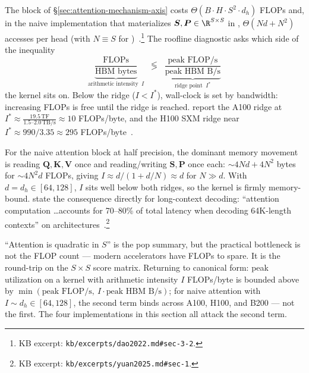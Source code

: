 The  block of \S\ref{sec:attention-mechanism-axis}
costs $\Theta(B \cdot H \cdot S^2 \cdot d_h)$ FLOPs and, in the naive
implementation that materializes
$\boldsymbol{S}, \boldsymbol{P} \in \R^{S \times S}$ in ,
$\Theta(N d + N^2)$  accesses per head (with $N \equiv S$ for
)~\citep[\S 3.2 Thm.\ 2]{dao2022}.\footnote{KB excerpt:
\nolinkurl{kb/excerpts/dao2022.md#sec-3-2}.} The roofline diagnostic
asks which side of the inequality
\begin{equation}
  \underbrace{\frac{\text{FLOPs}}{\text{HBM bytes}}}_{\text{arithmetic intensity }\ I}
  \;\;\lessgtr\;\;
  \underbrace{\frac{\text{peak FLOP/s}}{\text{peak HBM B/s}}}_{\text{ridge point }\ I^*}
  \label{eq:roofline}
\end{equation}
the kernel sits on. Below the ridge ($I < I^*$), wall-clock is set by
 bandwidth: increasing FLOPs is free until the ridge is reached.
\citet{dao2022} report the A100 ridge at $I^* \approx
\tfrac{19.5\,\text{TF}}{1.5\text{--}2.0\,\text{TB/s}} \approx 10$
FLOPs/byte, and the H100 SXM ridge near $I^* \approx 990 / 3.35
\approx 295$ FLOPs/byte~\citep[\S 2.1]{dao2022}\citep[\S 1]{shah2024}.

For the naive attention block at half precision, the dominant memory
movement is reading $\boldsymbol{Q}, \boldsymbol{K}, \boldsymbol{V}$ once
and reading/writing $\boldsymbol{S}, \boldsymbol{P}$ once each:
$\sim\!4 N d + 4 N^2$ bytes for $\sim\!4 N^2 d$ FLOPs, giving
$I \approx d / (1 + d/N) \approx d$ for $N \gg d$. With $d = d_h \in
[64, 128]$, $I$ sits well below both ridges, so the kernel is
firmly memory-bound. \citet{yuan2025} state the consequence directly
for long-context decoding: ``attention computation \dots accounts for
70--80\% of total latency when decoding 64K-length contexts'' on
 architectures~\citep[\S 1]{yuan2025}.\footnote{KB excerpt:
\nolinkurl{kb/excerpts/yuan2025.md#sec-1}.}

\begin{intuition}
``Attention is quadratic in $S$'' is the pop summary, but the
practical bottleneck is not the FLOP count --- modern accelerators have
FLOPs to spare. It is the  round-trip on the $S \times S$ score
matrix. Returning to canonical form: peak utilization on a kernel with
arithmetic intensity $I$ FLOPs/byte is bounded above by
$\min(\text{peak FLOP/s},\ I \cdot \text{peak HBM B/s})$; for naive
attention with $I \sim d_h \in [64, 128]$, the second term binds
across A100, H100, and B200 --- not the first. The four implementations
in this section all attack the second term.
\end{intuition}

